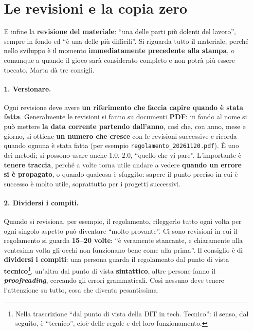 \section{Le revisioni e la copia zero}
\label{a14:sec:revisioni}

E infine la \textbf{revisione del materiale}: ``una delle parti più dolenti del lavoro'',
sempre in fondo ed ``è una delle più difficili''. Si riguarda tutto il materiale, perché nello
sviluppo è il momento \textbf{immediatamente precedente alla stampa}, o comunque a quando il
gioco sarà considerato completo e non potrà più essere toccato. Marta dà tre consigli.

\paragraph{1. Versionare.} Ogni revisione deve avere \textbf{un riferimento che faccia capire
quando è stata fatta}. Generalmente le revisioni si fanno su documenti \textbf{PDF}: in fondo
al nome si può mettere \textbf{la data corrente partendo dall'anno}, così che, con anno, mese
e giorno, si ottiene \textbf{un numero che cresce} con le revisioni successive e ricorda quando
ognuna è stata fatta (per esempio \texttt{regolamento\_20261120.pdf}). È uno dei metodi; si
possono usare anche 1.0, 2.0, ``quello che vi pare''. L'importante è \textbf{tenere traccia},
perché a volte torna utile andare a vedere \textbf{quando un errore si è propagato}, o quando
qualcosa è sfuggito: sapere il punto preciso in cui è successo è molto utile, soprattutto per
i progetti successivi.

\paragraph{2. Dividersi i compiti.} Quando si revisiona, per esempio, il regolamento,
rileggerlo tutto ogni volta per ogni singolo aspetto può diventare ``molto provante''. Ci sono
revisioni in cui il regolamento si guarda \textbf{15--20 volte}: ``è veramente stancante, e
chiaramente alla ventesima volta gli occhi non funzionano bene come alla prima''. Il consiglio
è di \textbf{dividersi i compiti}: una persona guarda il regolamento dal punto di vista
\textbf{tecnico}\footnote{Nella trascrizione ``dal punto di vista della DIT in tech.
Tecnico'': il senso, dal seguito, è ``tecnico'', cioè delle regole e del loro funzionamento.},
un'altra dal punto di vista \textbf{sintattico}, altre persone fanno il \textbf{\emph{proofreading}},
cercando gli errori grammaticali. Così nessuno deve tenere l'attenzione su tutto, cosa che
diventa pesantissima.


